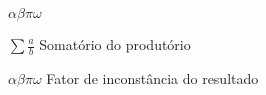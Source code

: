 \begin{listofsymbols}{$\alpha\beta\pi\omega$}
    \item[$\sum{\frac{a}{b}}$] Somatório do produtório
    \item[$\alpha\beta\pi\omega$] Fator de inconstância do resultado
\end{listofsymbols}